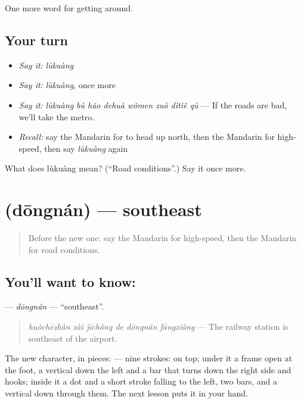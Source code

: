 \begin{grammarlens}[title={What you've built}]
One more word for getting around.
\end{grammarlens}

\subsection*{Your turn}
\begin{itemize}
\raggedright
  \item \emph{Say it:} \emph{lùkuàng}
  \item \emph{Say it:} \emph{lùkuàng}, once more
  \item \emph{Say it:} \emph{lùkuàng bù hǎo dehuà wǒmen zuò dìtiě qù} — If the roads are bad, we'll take the metro.
  \item \emph{Recall:} say the Mandarin for to head up north, then the Mandarin for high-speed, then say \emph{lùkuàng} again
\end{itemize}

\begin{tcolorbox}[breakable,colback=teal!4,colframe=teal!35!black,title={Before you move on}]
What does lùkuàng mean? (\textquotedblleft{}Road conditions\textquotedblright{}.) Say it once more.
\end{tcolorbox}
\section[\texorpdfstring{\zh{东南} (dōngnán)}{东南 (dōngnán)}]{ (dōngnán) — southeast}

\label{lesson:ZH-C423-dongnan}



\begin{quote}
Before the new one: say the Mandarin for high-speed, then the Mandarin for road conditions.
\end{quote}

\subsection*{You'll want to know: }
\textbf{} — \emph{dōngnán} — \textquotedblleft{}southeast\textquotedblright{}.

\begin{quote}
\emph{huǒchēzhàn zài jīchǎng de dōngnán fāngxiàng} — The railway station is southeast of the airport.
\end{quote}

The new character, in pieces:  — nine strokes:  on top; under it a frame open at the foot, a vertical down the left and a bar that turns down the right side and hooks; inside it a dot and a short stroke falling to the left, two bars, and a vertical down through them. The next lesson puts it in your hand.

